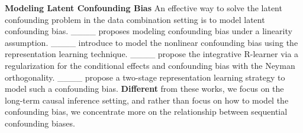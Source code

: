 \textbf{Modeling Latent Confounding Bias}
An effective way to solve the latent confounding problem in the data combination setting is to model latent confounding bias.
____ proposes modeling confounding bias under a linearity assumption.
____ introduce to model the nonlinear confounding bias using the representation learning technique.
____ propose the integrative R-learner via a regularization for the conditional effects and confounding bias with the Neyman orthogonality.
____ propose a two-stage representation learning strategy to model such a confounding bias.
\textbf{Different} from these works, we focus on the long-term causal inference setting, and rather than focus on how to model the confounding bias, we concentrate more on the relationship between sequential confounding biases.